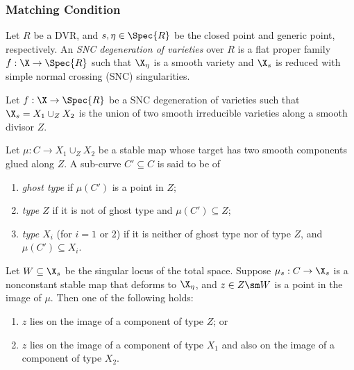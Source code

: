 \documentclass[12pt]{article}
\theoremstyle{plain}
\begin{document}
\subsubsection{Matching Condition}

\begin{defn}\label{definition:snc_degeneration}
Let $R$ be a DVR, and $s,\eta \in \Spec{R}$ be the closed point and generic point, respectively. An \textit{SNC degeneration of varieties} over $R$ is a flat proper family $f : \X \to \Spec{R}$ such that $\X_\eta$ is a smooth variety and $\X_s$ is reduced with simple normal crossing (SNC) singularities.
\end{defn}

Let $f : \X \to \Spec{R}$ be a SNC degeneration of varieties such that $\X_s = X_1 \cup_Z X_2$ is the union of two smooth irreducible varieties along a smooth divisor $Z$. 

\begin{defn}
Let $\mu : C \to X_1 \cup_Z X_2$ be a stable map whose target has two smooth components glued along $Z$. A sub-curve $C' \subseteq C$ is said to be of
\begin{enumerate}
    \item \emph{ghost type} if $\mu(C')$ is a point in $Z$;
    \item \emph{type $Z$} if it is not of ghost type and $\mu(C')\subseteq Z$; 
    \item \emph{type $X_i$} (for $i=1$ or $2$) if it is neither of ghost type nor of type $Z$, and $\mu(C')\subseteq X_i$.
\end{enumerate}
\end{defn}

\begin{lemma} \label{lemma:breaking}
Let $W \subseteq \X_s$ be the singular locus of the total space. Suppose $\mu_s : C \to \X_s$ is a nonconstant stable map that deforms to $\X_\eta$, and $z \in Z \sm W$ is a point in the image of $\mu$. Then one of the following holds:
\begin{enumerate}
    \item $z$ lies on the image of a component of type $Z$; or
    \item $z$ lies on the image of a component of type $X_1$ and also on the image of a component of type $X_2$.
\end{enumerate}
\end{lemma}
\end{document}
